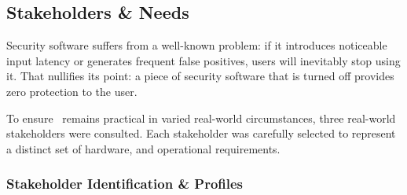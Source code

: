 \subsection{Stakeholders \& Needs}

Security software suffers from a well-known problem: if it introduces noticeable input latency or generates frequent false positives, users will inevitably stop using it. That nullifies its point: a piece of security software that is turned off provides zero protection to the user.

To ensure \projectNameFormatted\ remains practical in varied real-world circumstances, three real-world stakeholders were consulted. Each stakeholder was carefully selected to represent a distinct set of hardware, and operational requirements.

\subsubsection{Stakeholder Identification \& Profiles}

